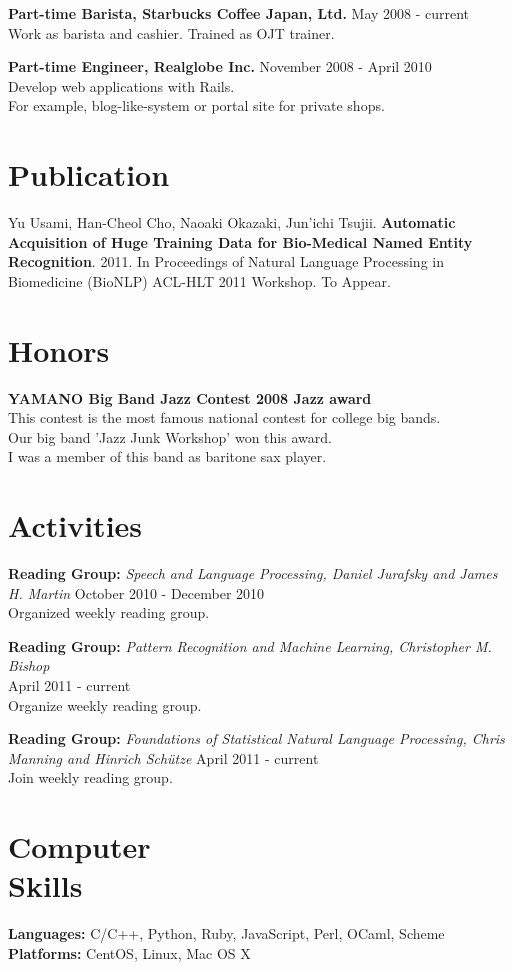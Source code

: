 \documentclass[margin]{res}
\begin{document}
\begin{resume}
\textbf{Part-time Barista, Starbucks Coffee Japan, Ltd.} \hfill May 2008 - current\\
Work as barista and cashier. Trained as OJT trainer. 

\textbf{Part-time Engineer, Realglobe Inc.} \hfill November 2008 - April 2010\\
Develop web applications with Rails.\\
For example, blog-like-system or portal site for private shops.

\section{Publication}
Yu Usami, Han-Cheol Cho, Naoaki Okazaki, Jun'ichi Tsujii. \textbf{Automatic Acquisition of Huge Training Data for Bio-Medical Named Entity Recognition}. 
2011. In Proceedings of Natural Language Processing in Biomedicine (BioNLP) ACL-HLT 2011 Workshop. To Appear.

\section{Honors}
\textbf{YAMANO Big Band Jazz Contest 2008 Jazz award} \\
This contest is the most famous national contest for college big bands.\\
Our big band 'Jazz Junk Workshop' won this award. \\
I was a member of this band as baritone sax player.

\section{Activities}
\textbf{Reading Group:} {\sl Speech and Language Processing, Daniel Jurafsky and James H. Martin} \hfill October 2010 - December 2010  \\
Organized weekly reading group. 

\textbf{Reading Group:} {\sl Pattern Recognition and Machine Learning, Christopher M. Bishop} \\ \hfill April 2011 - current\\
Organize weekly reading group. 

\textbf{Reading Group:} {\sl Foundations of Statistical Natural Language Processing, Chris Manning and Hinrich Schütze} \hfill April 2011 - current\\
Join weekly reading group.

\section{Computer \\ Skills}
\textbf{Languages:} C/C++, Python, Ruby, JavaScript, Perl, OCaml, Scheme \\
\textbf{Platforms:} CentOS, Linux, Mac OS X 


\end{resume}
\end{document}
